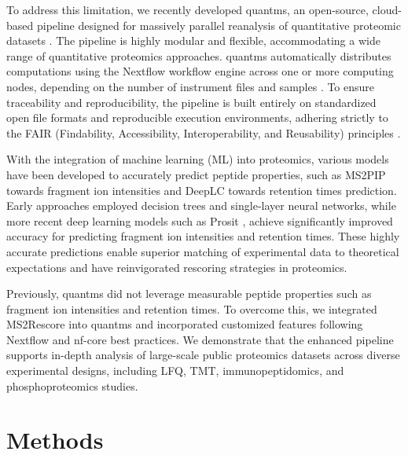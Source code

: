 \documentclass[12pt]{article}
\begin{document}
To address this limitation, we recently developed quantms, an open-source, cloud-based pipeline designed for massively parallel reanalysis of quantitative proteomic datasets \cite{dai_quantms_2024}. The pipeline is highly modular and flexible, accommodating a wide range of quantitative proteomics approaches. quantms automatically distributes computations using the Nextflow workflow engine across one or more computing nodes, depending on the number of instrument files and samples \cite{di_tommaso_nextflow_2017}. To ensure traceability and reproducibility, the pipeline is built entirely on standardized open file formats and reproducible execution environments, adhering strictly to the FAIR (Findability, Accessibility, Interoperability, and Reusability) principles \cite{wilkinson_fair_2016}.

With the integration of machine learning (ML) into proteomics, various models have been developed to accurately predict peptide properties, such as MS2PIP \cite{degroeve_ms2pip_2013} towards fragment ion intensities and DeepLC \cite{bouwmeester_deeplc_2021} towards retention times prediction. Early approaches employed decision trees and single-layer neural networks, while more recent deep learning models such as Prosit \cite{gessulat_prosit_2019}, achieve significantly improved accuracy for predicting fragment ion intensities and retention times. These highly accurate predictions enable superior matching of experimental data to theoretical expectations and have reinvigorated rescoring strategies in proteomics.

Previously, quantms did not leverage measurable peptide properties such as fragment ion intensities and retention times. To overcome this, we integrated MS2Rescore into quantms and incorporated customized features following Nextflow and nf-core best practices. We demonstrate that the enhanced pipeline supports in-depth analysis of large-scale public proteomics datasets across diverse experimental designs, including LFQ, TMT, immunopeptidomics, and phosphoproteomics studies.

\section{Methods}
\end{document}
